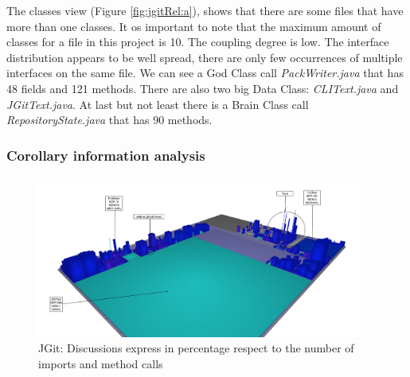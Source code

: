 \documentclass[]{usiinfbachelorproject}
\begin{document}
The classes view (Figure \ref{fig:jgitRel:a}), shows that there are some files that have more than one classes. It os important to note that the maximum amount of classes for a file in this project is 10. The coupling degree is low. The interface distribution appears to be well spread, there are only few occurrences of multiple interfaces on the same file. We can see a God Class call  \textit{PackWriter.java} that has 48 fields and 121 methods. There are also two big Data Class: \textit{CLIText.java} and \textit{JGitText.java}. At last but not least there is a Brain Class call  \textit{RepositoryState.java} that has 90 methods.
 


\subsubsection{Corollary information analysis}
 
 
 
\begin{figure}[H]
	\centering
	\includegraphics[width=0.95\textwidth]{images/jgitDiscussion}
	\caption[JGit: Discussions]{JGit: Discussions express in percentage respect to the number of imports and method calls \label{fig:jgitCorrollary:a}}
\end{figure}
\end{document}
